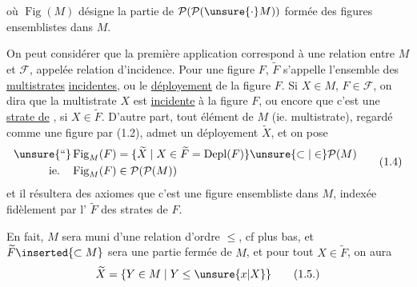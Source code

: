 où $\operatorname{Fig}(M)$ désigne la partie de $\mathcal P(\mathcal P(\unsure{\cdot}M))$ formée des figures ensemblistes dans $M$. 

On peut considérer que la première application correspond à une relation entre $M$ et $\mathcal F$, appelée relation d'incidence. Pour une figure $F$, $\widetilde F$ s'appelle l'ensemble des \uline{multistrates} \uline{incidentes}, ou le \uline{déployement} de la figure $F$. Si $X\in M$, $F\in\mathcal F$, on dira que la multistrate $X$ est \uline{incidente} à la figure $F$, ou encore que c'est une \uline{strate de} , si $X\in\widetilde F$. D'autre part, tout élément  de $M$ (ie.  multistrate), regardé comme une figure par (1.2), admet un déployement $\widetilde X$, et    on pose
\margin{$\unsure{\bullet|\cdot}$}
\begingroup\makeatletter\tagsleft@true\let\veqno\@@leqno\makeatother
\[
\begin{aligned}
\text{\unsure{``}}\operatorname{Fig}_{M}(F)&=\{\widetilde X\mid X\in\widetilde F=\operatorname{Depl}(F)\}\unsure{\subset|\in}\mathcal P(M)\\
\text{ie.}\quad \operatorname{Fig}_{M}(F)&\in\mathcal P(\mathcal P(M))
\end{aligned}\tag*{(1.4)}
\]
\endgroup
et il résultera des axiomes que c'est une figure ensembliste dans $M$, indexée fidèlement par l' $\widetilde F$ des strates de $F$.

  En fait, $M$ sera muni d'une relation d'ordre $\leq$, cf plus bas, et $\widetilde F\inserted{\subset M}$ sera une partie fermée de  $M$, et pour tout $X\in\widetilde F$,  on aura
\begingroup\makeatletter\tagsleft@true\let\veqno\@@leqno\makeatother
\[
\widetilde X=\{Y\in M\mid Y\leq\unsure{x|X}\}\tag*{(1.5.)}
\]
\endgroup
